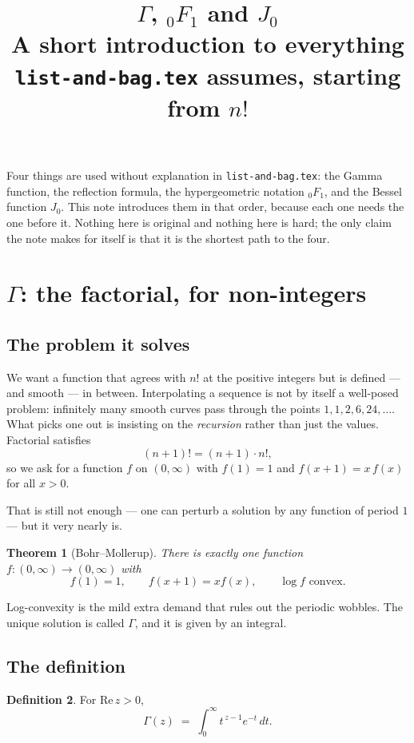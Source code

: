 \documentclass[11pt,a4paper]{article}
\title{\bfseries $\Gamma$, ${}_0F_1$ and $J_0$\\[0.4em]
\large A short introduction to everything \texttt{list-and-bag.tex} assumes,
starting from $n!$}
\author{}
\date{}
\newtheorem{theorem}{Theorem}[section]
\theoremstyle{definition}
\newtheorem{definition}[theorem]{Definition}
\theoremstyle{remark}
\newcommand{\dd}{\,d}
\begin{document}
\maketitle

\noindent
Four things are used without explanation in \texttt{list-and-bag.tex}: the Gamma
function, the reflection formula, the hypergeometric notation ${}_0F_1$, and the
Bessel function $J_0$. This note introduces them in that order, because each one
needs the one before it. Nothing here is original and nothing here is hard; the only
claim the note makes for itself is that it is the shortest path to the four.

\section{$\Gamma$: the factorial, for non-integers}

\subsection{The problem it solves}

We want a function that agrees with $n!$ at the positive integers but is defined --- and
smooth --- in between. Interpolating a sequence is not by itself a well-posed problem:
infinitely many smooth curves pass through the points $1, 1, 2, 6, 24, \dots$. What
picks one out is insisting on the \emph{recursion} rather than just the values.
Factorial satisfies
\[
  (n+1)! = (n+1)\cdot n! ,
\]
so we ask for a function $f$ on $(0,\infty)$ with $f(1) = 1$ and
$f(x+1) = x\,f(x)$ for all $x > 0$.

That is still not enough --- one can perturb a solution by any function of period $1$ ---
but it very nearly is.

\begin{theorem}[Bohr--Mollerup]\label{thm:BM}
There is exactly one function $f : (0,\infty) \to (0,\infty)$ with
\[
  f(1) = 1, \qquad f(x+1) = x f(x), \qquad \log f \text{ convex} .
\]
\end{theorem}

\noindent
Log-convexity is the mild extra demand that rules out the periodic wobbles. The unique
solution is called $\Gamma$, and it is given by an integral.

\subsection{The definition}

\begin{definition}\label{def:gamma}
For $\mathrm{Re}\,z > 0$,
\[
  \Gamma(z) \;=\; \int_0^\infty t^{\,z-1} e^{-t} \dd t .
\]
\end{definition}
\end{document}
